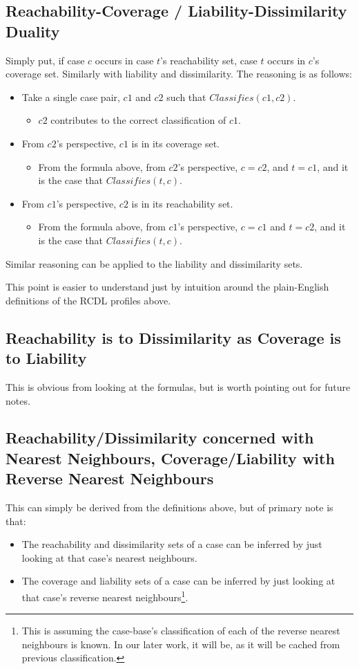 \documentclass[a4paper,11pt]{report}
\begin{document}
\subsection{Reachability-Coverage / Liability-Dissimilarity Duality\label{sec:duality}}
Simply put, if case $c$ occurs in case $t$'s reachability set, case $t$ occurs in $c$'s coverage set. Similarly with liability and dissimilarity.
The reasoning is as follows:
\begin{itemize}
	\item Take a single case pair, $c1$ and $c2$ such that $Classifies(c1, c2)$.
	\begin{itemize}
		\item $c2$ contributes to the correct classification of $c1$.
	\end{itemize}
	\item From $c2$'s perspective, $c1$ is in its coverage set.
	\begin{itemize}
		\item From the formula above, from $c2$'s perspective, $c=c2$, and $t=c1$, and it is the case that $Classifies(t, c)$.
	\end{itemize}
	\item From $c1$'s perspective, $c2$ is in its reachability set.
	\begin{itemize}
		\item From the formula above, from $c1$'s perspective, $c=c1$ and $t=c2$, and it is the case that $Classifies(t, c)$.
	\end{itemize}
\end{itemize}

Similar reasoning can be applied to the liability and dissimilarity sets.

This point is easier to understand just by intuition around the plain-English definitions of the RCDL profiles above.

\subsection{Reachability is to Dissimilarity as Coverage is to Liability}
This is obvious from looking at the formulas, but is worth pointing out for future notes.

\subsection{Reachability/Dissimilarity concerned with Nearest Neighbours, Coverage/Liability with Reverse Nearest Neighbours \label{sec:RdWithNnClWithRnn}}
This can simply be derived from the definitions above, but of primary note is that:
\begin{itemize}
	\item The reachability and dissimilarity sets of a case can be inferred by just looking at that case's nearest neighbours.
	\item The coverage and liability sets of a case can be inferred by just looking at that case's reverse nearest neighbours\footnote{This is assuming the case-base's classification of each of the reverse nearest neighbours is known. In our later work, it will be, as it will be cached from previous classification.}.
\end{itemize}
\end{document}
